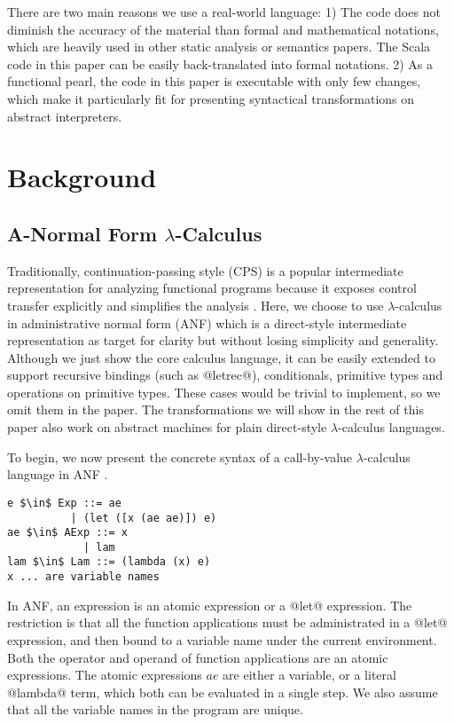 \documentclass[acmsmall,review,anonymous]{acmart}\settopmatter{printfolios=true,printccs=false,printacmref=false}
\begin{document}
There are two main reasons we use a real-world language:
1) The code does not diminish the accuracy of the material
than formal and mathematical notations, 
which are heavily used in other static analysis or semantics papers.
The Scala code in this paper can be easily back-translated into formal notations.
2) As a functional pearl, the code in this paper is executable with only few changes, 
which make it particularly fit for presenting syntactical transformations on abstract
interpreters.
\fi

\section{Background} \label{background}

\subsection{A-Normal Form $\lambda$-Calculus} \label{anfsyntax}

Traditionally, continuation-passing style (CPS) is a popular intermediate representation
for analyzing functional programs because it exposes control transfer explicitly
and simplifies the analysis \cite{Shivers:1991:SSC:115865.115884, Shivers:1988:CFA:53990.54007}.
Here, we choose to use $\lambda$-calculus in administrative normal form (ANF) 
which is a direct-style intermediate representation as target for clarity 
but without losing simplicity and generality.
Although we just show the core calculus language, it can be easily extended
to support recursive bindings (such as @letrec@), conditionals, primitive types and 
operations on primitive types. These cases would be trivial to implement, 
so we omit them in the paper.
The transformations we will show in the rest of this paper
also work on abstract machines for plain direct-style $\lambda$-calculus languages.

To begin, we now present the concrete syntax of a call-by-value $\lambda$-calculus language 
in ANF \cite{flanagan1993essence}.

\begin{lstlisting}
e $\in$ Exp ::= ae
          | (let ([x (ae ae)]) e)
ae $\in$ AExp ::= x            
            | lam
lam $\in$ Lam ::= (lambda (x) e)
x ... are variable names
\end{lstlisting}

In ANF, an expression is an atomic expression or a @let@ expression.
The restriction is that all the function applications must be administrated in a @let@ expression,
and then bound to a variable name under the current environment.
Both the operator and operand of function applications are an atomic expressions.
The atomic expressions $ae$ are either a variable, or a literal @lambda@ term, which
both can be evaluated in a single step.
We also assume that all the variable names in the program are unique.
\end{document}
